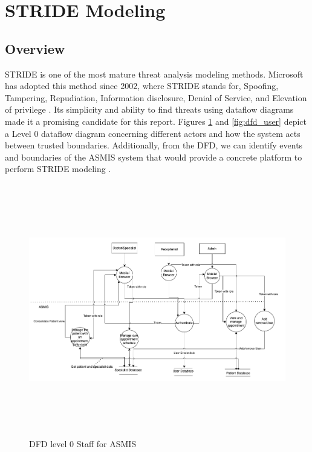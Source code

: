 \section{STRIDE Modeling}
\subsection{Overview}
STRIDE is one of the most mature threat analysis modeling methods. Microsoft has adopted this method since 2002, where STRIDE stands for, Spoofing, Tampering, Repudiation, Information disclosure, Denial of Service, and Elevation of privilege \citep[p.~1]{shevchenko2018threat}. Its simplicity and ability to find threats using dataflow diagrams made it a promising candidate for this report.\newline\newline
Figures \ref{fig:dfd_staff} and \ref{fig:dfd_user} depict a Level 0 dataflow diagram concerning different actors and how the system acts between trusted boundaries. Additionally, from the DFD, we can identify events and boundaries of the ASMIS system that would provide a concrete platform to perform STRIDE modeling \citep[p.~1]{shevchenko2018threat}.

\begin{figure}[h!]
\centering
\includegraphics[width=16cm, height=11cm]{pics/dfd_staff.png}
\caption{DFD level 0 Staff for ASMIS}\label{fig:dfd_staff}
\end{figure}

